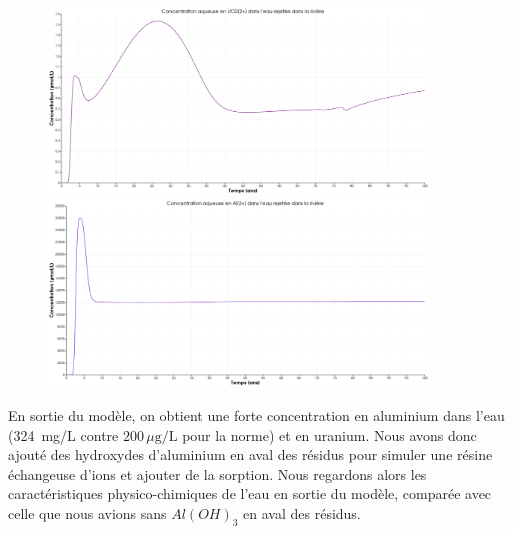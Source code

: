 \documentclass{article}
\begin{document}
\begin{figure}[H]
    \centering
    \begin{minipage}{0.5\textwidth}
        \centering
        \includegraphics[width=0.9\textwidth]{III_B_2_20.png} 
        \caption{}
        \label{fig:UO2_riviere_Al}
    \end{minipage}\hfill
    \begin{minipage}{0.5\textwidth}
        \centering
        \includegraphics[width=0.9\textwidth]{III_B_2_21.png} 
        \caption{}
        \label{fig:Al_riviere_Al}
    \end{minipage}
\end{figure}


En sortie du modèle, on obtient une forte concentration en aluminium dans l’eau (324~mg/L contre $200 \, \mu \text{g/L}$ pour la norme) et en uranium. Nous avons donc ajouté des hydroxydes d’aluminium en aval des résidus pour simuler une résine échangeuse d’ions et ajouter de la sorption.
Nous regardons alors les caractéristiques physico-chimiques de l’eau en sortie du modèle, comparée avec celle que nous avions sans $Al(OH)_3$ en aval des résidus.
\end{document}
